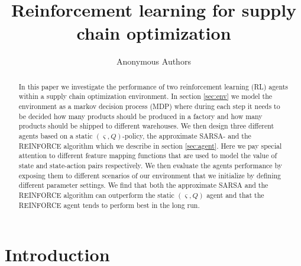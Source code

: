 \documentclass[journal, a4paper]{IEEEtran}
\theoremstyle{plain}
\theoremstyle{definition}
\begin{document}
\title{Reinforcement learning for supply chain optimization}
\author{Anonymous Authors}
\maketitle

\begin{abstract}
	In this paper we investigate the performance of two reinforcement learning (RL) agents within a supply chain optimization environment. In section \ref{sec:env} we model the environment as a markov decision process (MDP) where during each step it needs to be decided how many products should be produced in a factory and how many products should be shipped to different warehouses. We then design three different agents based on a static $(\varsigma, Q)$-policy, the approximate SARSA- and the REINFORCE algorithm which we describe in section \ref{sec:agent}. Here we pay special attention to different feature mapping functions that are used to model the value of state and state-action pairs respectively. We then evaluate the agents performance by exposing them to different scenarios of our environment that we initialize by defining different parameter settings. We find that both the approximate SARSA and the REINFORCE algorithm can outperform the static $(\varsigma, Q)$ agent and that the REINFORCE agent tends to perform best in the long run.
\end{abstract}

\section{Introduction}
\label{sec:intro}

\end{document}
